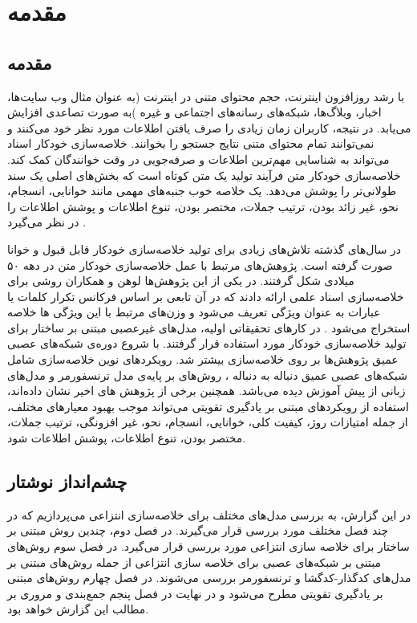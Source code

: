 \chapter{مقدمه}
\section{مقدمه}
با رشد روزافزون اینترنت، حجم محتوای متنی در اینترنت (به عنوان مثال وب سایت‌ها، اخبار، وبلاگ‌ها، شبکه‌های رسانه‌های اجتماعی و غیره )به صورت تصاعدی افزایش می‌یابد. در نتیجه، کاربران زمان زیادی را صرف یافتن اطلاعات مورد نظر خود می‌کنند و نمی‌توانند تمام محتوای متنی نتایج جستجو را بخوانند. خلاصه‌سازی خودکار اسناد می‌تواند به شناسایی مهم‌ترین اطلاعات و صرفه‌جویی در وقت خوانندگان کمک کند. خلاصه‌سازی خودکار متن فرآیند تولید یک متن کوتاه است که بخش‌های اصلی یک سند طولانی‌تر را پوشش می‌دهد. یک خلاصه خوب جنبه‌های مهمی مانند خوانایی، انسجام، نحو، غیر زائد بودن، ترتیب جملات، مختصر بودن، تنوع اطلاعات و پوشش اطلاعات را در نظر می‌گیرد
\cite{ELKASSAS2021113679}
.


در سال‌های گذشته تلاش‌های زیادی برای تولید خلاصه‌سازی خودکار قابل قبول و خوانا صورت گرفته است. 
پژوهش‌های مرتبط با عمل خلاصه‌سازی خودکار متن در دهه ۵۰ میلادی شکل گرفتند. در یکی از این پژوهش‌ها لوهن و همکاران روشی برای خلاصه‌سازی اسناد علمی ‌ارائه دادند که در آن تابعی بر اساس فرکانس تکرار کلمات یا عبارات به عنوان ویژگی تعریف ‌می‌شود و وزن‌های مرتبط با این ویژگی ها خلاصه استخراج می‌شود
\cite{luhn1958automatic}.
در کارهای تحقیقاتی اولیه، مدل‌های غیرعصبی  مبتنی بر ساختار برای تولید خلاصه‌سازی خودکار مورد استفاده قرار گرفتند. با شروع دوره‌ی شبکه‌های عصبی عمیق پژوهش‌ها بر روی خلاصه‌سازی بیشتر شد. رویکرد‌های نوین خلاصه‌سازی شامل شبکه‌های عصبی عمیق دنباله به دنباله
، روش‌های بر پایه‌ی مدل ترنسفورمر 
و مدل‌های زبانی از پیش آموزش دیده
می‌باشد. 
همچنین برخی از پژوهش های اخیر نشان داده‌اند، استفاده از رویکردهای مبتنی بر یادگیری تقویتی
می‌تواند موجب بهبود معیارهای مختلف، از جمله امتیازات روژ، کیفیت کلی، خوانایی، انسجام، نحو، غیر افزونگی، ترتیب جملات، مختصر بودن، تنوع اطلاعات، پوشش اطلاعات شود. 
\section{چشم‌انداز نوشتار}
در این گزارش، به بررسی مدل‌های مختلف برای خلاصه‌سازی انتزاعی می‌پردازیم که در چند فصل مختلف مورد بررسی قرار می‌گیرند. در فصل دوم، 
 چندین روش مبتنی بر ساختار برای خلاصه سازی انتزاعی مورد بررسی قرار می‌گیرد. در فصل سوم روش‌های مبتنی بر شبکه‌های عصبی برای خلاصه سازی انتزاعی از جمله روش‌های مبتنی بر مدل‌های کدگذار-کدگشا و ترنسفورمر بررسی می‌شوند. در فصل چهارم روش‌های مبتنی بر یادگیری تقویتی مطرح می‌شود و در نهایت در فصل پنجم جمع‌بندی و مروری بر مطالب این گزارش خواهد بود.
